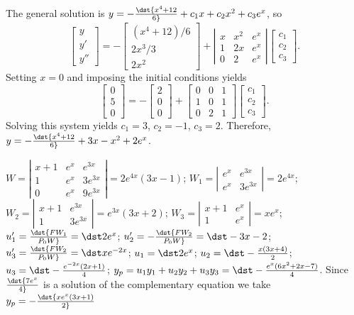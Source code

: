 \documentclass[dvips]{book}
\renewcommand{\exer}[1]{\par\medskip\;\noindent{\color{red}\bf #1.}}
\numberwithin{example}{section}
\numberwithin{equation}{section}
\numberwithin{theorem}{section}
\numberwithin{table}{section}
\numberwithin{figure}{section}
\newcommand{\threecol}[3]{\left[\begin{array}{r}#1\\#2\\#3\end{array}\right]}
\newcommand{\threebythree}[9]{\left[\begin{array}{rrr}
#1&#2&#3\\#4&#5&#6\\#7&#8&#9\end{array}\right]}
\begin{document}
The general solution is
$y=-\dst{x^4+12\over6}+c_1x+c_2x^2+c_3e^x$, so
$$
\left[\begin{array}{l}y\\y'\\y''
\end{array}\right]=-
\left[\begin{array}{c}
(x^4+12)/6\\2x^3/3\\2x^2
\end{array}\right]+
\left|\begin{array}{cccc}
x&x^2&e^x\\1&2x&e^x\\0&2&e^x\end{array}\right|
\threecol{c_1}{c_2}{c_3}.
$$
Setting $x=0$ and imposing the initial conditions yields
$$
\threecol050=
-\threecol200+\threebythree001101021\threecol{c_1}{c_2}{c_3}.
$$
Solving this system yields $c_1=3$, $c_2=-1$, $c_3=2$.
Therefore,
$y=-\dst{x^4+12\over6}+3x-x^2+2e^x$.



\exer{9.4.28}
$W=\left|\begin{array}{cccc}
x+1&e^x&e^{3x}\\1&e^x&3e^{3x}\\0&e^x&9e^{3x}
\end{array}\right|=2e^{4x}(3x-1)$;
$W_1=\left|\begin{array}{cccc}
e^x&e^{3x}\\e^x&3e^{3x}\end{array}\right|=2e^{4x}$;
$W_2=\left|\begin{array}{cccc}
x+1&e^{3x}\\1&3e^{3x}\end{array}\right|=e^{3x}(3x+2)$;
$W_3=\left|\begin{array}{cccc}
x+1&e^x\\1&e^x\end{array}\right|=xe^x$;
$u_1'=\dst{FW_1\over P_0W}=\dst 2e^x$;
$u_2'=-\dst{FW_2\over P_0W}=\dst-3x-2$;
$u_3'=\dst{FW_2\over P_0W}=\dst xe^{-2x}$;
$u_1=\dst 2e^x$;
$u_2=\dst-{x(3x+4)\over2}$;
$u_3=\dst-{e^{-2x}(2x+1)\over4}$;
$y_p=u_1y_1+u_2y_2+u_3y_3=\dst-{e^x(6x^2+2x-7)\over4}$.
Since $\dst{7e^x\over4}$ is a solution of the complementary
equation we take
$y_p=-\dst{xe^x(3x+1)\over2}$
\end{document}
